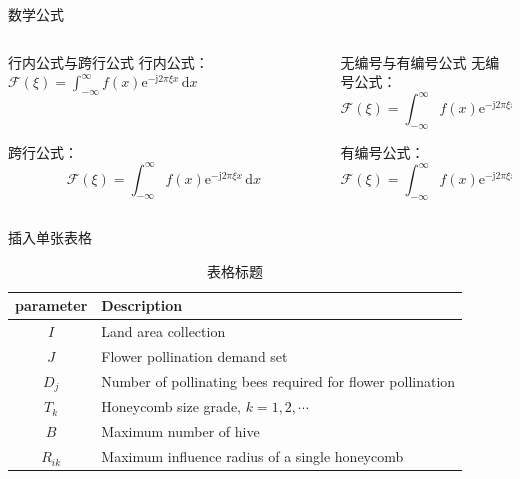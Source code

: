 \documentclass[12pt]{beamer}
\begin{document}
\begin{frame}{数学公式}
    \begin{columns}[T,onlytextwidth]
        \begin{column}{0.48\textwidth}
            \begin{block}{行内公式与跨行公式}
                行内公式：$\mathcal{F}(\xi)=\int_{-\infty}^{\infty} f(x)\mathrm{e}^{-\mathrm{j}2\pi
                \xi x}\,\mathrm{d}x$

                ~\par

                跨行公式：
                $$
                \mathcal{F}(\xi)=\int_{-\infty}^{\infty} f(x)\mathrm{e}^{-\mathrm{j}2\pi\xi x}\,\mathrm{d}x
                $$
            \end{block}
        \end{column}
        
        \begin{column}{0.48\textwidth}
            \begin{block}{无编号与有编号公式}
                无编号公式：
                \begin{equation*}
                    \mathcal{F}(\xi)=\int_{-\infty}^{\infty} f(x)\mathrm{e}^{-\mathrm{j}2\pi
                    \xi x}\,\mathrm{d}x
                \end{equation*}

                有编号公式：
                \begin{equation}
                    \mathcal{F}(\xi)=\int_{-\infty}^{\infty} f(x)\mathrm{e}^{-\mathrm{j}2\pi
                    \xi x}\,\mathrm{d}x
                \end{equation}
            \end{block}
        \end{column}
    \end{columns}
\end{frame}

\begin{frame}{插入单张表格}
    \begin{table}[H]
        \centering
            \begin{tabular}{c||l}
            \toprule
            parameter  & Description \\
            \midrule
            $I$ & Land area collection \\
            $J$ & Flower pollination demand set \\
            $D_j$ & Number of pollinating bees required for flower pollination \\
            $T_k$ & Honeycomb size grade, $k = 1, 2, \cdots$ \\
            $B$ & Maximum number of hive \\
            $R_{ik}$ & Maximum influence radius of a single honeycomb \\
            \bottomrule
            \end{tabular}%
        \caption{表格标题}
        \label{tab: 一个表}%
    \end{table}%
\end{frame}
\end{document}
